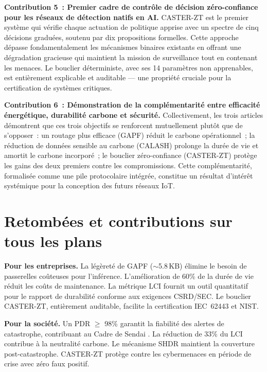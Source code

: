 \textbf{Contribution 5~: Premier cadre de contrôle de décision zéro-confiance pour les réseaux de détection natifs en AI.}
CASTER-ZT est le premier système qui vérifie chaque actuation de politique apprise avec un spectre de cinq décisions graduées, soutenu par dix propositions formelles. Cette approche dépasse fondamentalement les mécanismes binaires existants en offrant une dégradation gracieuse qui maintient la mission de surveillance tout en contenant les menaces. Le bouclier déterministe, avec ses 14 paramètres non apprenables, est entièrement explicable et auditable --- une propriété cruciale pour la certification de systèmes critiques.

\textbf{Contribution 6~: Démonstration de la complémentarité entre efficacité énergétique, durabilité carbone et sécurité.}
Collectivement, les trois articles démontrent que ces trois objectifs se renforcent mutuellement plutôt que de s'opposer~: un routage plus efficace (GAPF) réduit le carbone opérationnel~; la réduction de données sensible au carbone (CALASH) prolonge la durée de vie et amortit le carbone incorporé~; le bouclier zéro-confiance (CASTER-ZT) protège les gains des deux premiers contre les compromissions. Cette complémentarité, formalisée comme une pile protocolaire intégrée, constitue un résultat d'intérêt systémique pour la conception des futurs réseaux IoT.


\section{Retombées et contributions sur tous les plans}\label{sec:concl-retombees}

\textbf{Pour les entreprises.}
La légèreté de GAPF ($\sim$5.8\,KB) élimine le besoin de passerelles coûteuses pour l'inférence. L'amélioration de 60\% de la durée de vie réduit les coûts de maintenance. La métrique LCI fournit un outil quantitatif pour le rapport de durabilité conforme aux exigences CSRD/SEC. Le bouclier CASTER-ZT, entièrement auditable, facilite la certification IEC~62443 et NIST.

\textbf{Pour la société.}
Un PDR $\geq$ 98\% garantit la fiabilité des alertes de catastrophe, contribuant au Cadre de Sendai \cite{UNDRR2015Sendai}. La réduction de 33\% du LCI contribue à la neutralité carbone. Le mécanisme SHDR maintient la couverture post-catastrophe. CASTER-ZT protège contre les cybermenaces en période de crise avec zéro faux positif.

